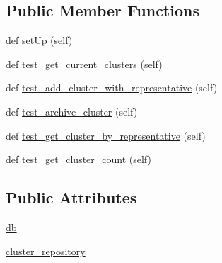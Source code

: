 \subsection*{Public Member Functions}
\begin{DoxyCompactItemize}
\item 
def \hyperlink{classNEAT__PyGenetics_1_1NEAT_1_1Tests_1_1RepositoryTests_1_1test__clusterRepository_1_1TestClusterRepository_ac796aabc9d2b5ede780a4a169c660730}{set\+Up} (self)
\item 
def \hyperlink{classNEAT__PyGenetics_1_1NEAT_1_1Tests_1_1RepositoryTests_1_1test__clusterRepository_1_1TestClusterRepository_a6994e2f71c1defcce3e4fbb22272d62a}{test\+\_\+get\+\_\+current\+\_\+clusters} (self)
\item 
def \hyperlink{classNEAT__PyGenetics_1_1NEAT_1_1Tests_1_1RepositoryTests_1_1test__clusterRepository_1_1TestClusterRepository_a34e4a80f92b43e2436aefb6f506cf48f}{test\+\_\+add\+\_\+cluster\+\_\+with\+\_\+representative} (self)
\item 
def \hyperlink{classNEAT__PyGenetics_1_1NEAT_1_1Tests_1_1RepositoryTests_1_1test__clusterRepository_1_1TestClusterRepository_a03c98f6f95e9085172a460da90718f15}{test\+\_\+archive\+\_\+cluster} (self)
\item 
def \hyperlink{classNEAT__PyGenetics_1_1NEAT_1_1Tests_1_1RepositoryTests_1_1test__clusterRepository_1_1TestClusterRepository_aa46b728b0dd9bc39d491f1f93fad2205}{test\+\_\+get\+\_\+cluster\+\_\+by\+\_\+representative} (self)
\item 
def \hyperlink{classNEAT__PyGenetics_1_1NEAT_1_1Tests_1_1RepositoryTests_1_1test__clusterRepository_1_1TestClusterRepository_acabc11488a7c53269dc9ed193b62a3e4}{test\+\_\+get\+\_\+cluster\+\_\+count} (self)
\end{DoxyCompactItemize}
\subsection*{Public Attributes}
\begin{DoxyCompactItemize}
\item 
\hyperlink{classNEAT__PyGenetics_1_1NEAT_1_1Tests_1_1RepositoryTests_1_1test__clusterRepository_1_1TestClusterRepository_a50cd224635a9b3ac6874c974ad6ffbc4}{db}
\item 
\hyperlink{classNEAT__PyGenetics_1_1NEAT_1_1Tests_1_1RepositoryTests_1_1test__clusterRepository_1_1TestClusterRepository_a8b29a81b6dbada0e6043c82570a684b7}{cluster\+\_\+repository}
\end{DoxyCompactItemize}


